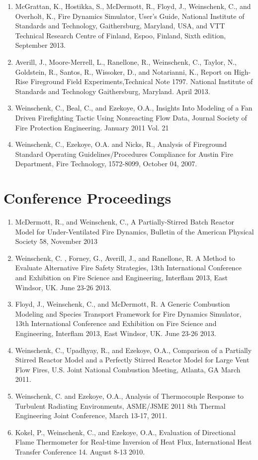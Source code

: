 \documentclass[10pt,letterpaper]{article}
\begin{document}
\begin{enumerate}
\item McGrattan, K., Hostikka, S., McDermott, R., Floyd, J., Weinschenk, C., and Overholt, K., Fire Dynamics Simulator, User’s Guide, National Institute of Standards and Technology, Gaithersburg, Maryland, USA, and VTT Technical Research Centre of Finland, Espoo, Finland, Sixth edition, September 2013.
\item Averill, J., Moore-Merrell, L., Ranellone, R., Weinschenk, C., Taylor, N., Goldstein, R., Santos, R., Wissoker, D., and Notarianni, K., Report on High-Rise Fireground Field Experiments,Technical Note 1797. National Institute of Standards and Technology Gaithersburg, Maryland. April 2013.
\item Weinschenk, C., Beal, C., and Ezekoye, O.A., Insights Into Modeling of a Fan Driven Firefighting Tactic Using Nonreacting Flow Data, Journal Society of Fire Protection Engineering. January 2011 Vol. 21
\item Weinschenk, C., Ezekoye, O.A. and Nicks, R., Analysis of Fireground Standard Operating Guidelines/Procedures Compliance for Austin Fire Department, Fire Technology, 1572-8099, October 04, 2007.
\end{enumerate}


\section*{Conference Proceedings}
\begin{enumerate}
\item McDermott, R., and Weinschenk, C., A Partially-Stirred Batch Reactor Model for Under-Ventilated Fire Dynamics, Bulletin of the American Physical Society 58, November 2013
\item Weinschenk, C. , Forney, G., Averill, J., and Ranellone, R. A Method to Evaluate Alternative Fire Safety Strategies, 13th International Conference and Exhibition on Fire Science and Engineering, Interflam 2013, East Windsor, UK. June 23-26 2013.
\item Floyd, J., Weinschenk, C., and McDermott, R. A Generic Combustion Modeling and Species Transport Framework for Fire Dynamics Simulator, 13th International Conference and Exhibition on Fire Science and Engineering, Interflam 2013, East Windsor, UK. June 23-26 2013.
\item Weinschenk, C., Upadhyay, R., and Ezekoye, O.A., Comparison of a Partially Stirred Reactor Model and a Perfectly Stirred Reactor Model for Large Vent Flow Fires, U.S. Joint National Combustion Meeting, Atlanta, GA March 2011.
\item Weinschenk, C. and Ezekoye, O.A., Analysis of Thermocouple Response to Turbulent Radiating Environments, ASME/JSME 2011 8th Thermal Engineering Joint Conference, March 13-17, 2011.
\item  Kokel, P., Weinschenk, C., and Ezekoye, O.A., Evaluation of Directional Flame Thermometer for Real-time Inversion of Heat Flux, International Heat Transfer Conference 14. August 8-13 2010.
\end{enumerate}
\end{document}
